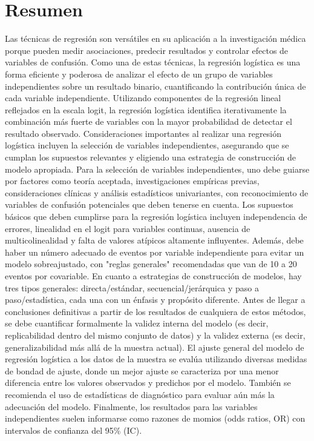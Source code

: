 \documentclass[12pt]{article}
\begin{document}
\section*{Resumen}
Las t\'ecnicas de regresi\'on son vers\'atiles en su aplicaci\'on a la investigaci\'on m\'edica porque pueden medir asociaciones, predecir resultados y controlar efectos de variables de confusi\'on. Como una de estas t\'ecnicas, la regresi\'on log\'istica es una forma eficiente y poderosa de analizar el efecto de un grupo de variables independientes sobre un resultado binario, cuantificando la contribuci\'on \'unica de cada variable independiente. Utilizando componentes de la regresi\'on lineal reflejados en la escala logit, la regresi\'on log\'istica identifica iterativamente la combinaci\'on m\'as fuerte de variables con la mayor probabilidad de detectar el resultado observado. Consideraciones importantes al realizar una regresi\'on log\'istica incluyen la selecci\'on de variables independientes, asegurando que se cumplan los supuestos relevantes y eligiendo una estrategia de construcci\'on de modelo apropiada. Para la selecci\'on de variables independientes, uno debe guiarse por factores como teor\'ia aceptada, investigaciones emp\'iricas previas, consideraciones cl\'inicas y an\'alisis estad\'isticos univariantes, con reconocimiento de variables de confusi\'on potenciales que deben tenerse en cuenta. Los supuestos b\'asicos que deben cumplirse para la regresi\'on log\'istica incluyen independencia de errores, linealidad en el logit para variables continuas, ausencia de multicolinealidad y falta de valores at\'ipicos altamente influyentes. Adem\'as, debe haber un n\'umero adecuado de eventos por variable independiente para evitar un modelo sobreajustado, con "reglas generales" recomendadas que van de 10 a 20 eventos por covariable. En cuanto a estrategias de construcci\'on de modelos, hay tres tipos generales: directa/est\'andar, secuencial/jer\'arquica y paso a paso/estad\'istica, cada una con un \'enfasis y prop\'osito diferente. Antes de llegar a conclusiones definitivas a partir de los resultados de cualquiera de estos m\'etodos, se debe cuantificar formalmente la validez interna del modelo (es decir, replicabilidad dentro del mismo conjunto de datos) y la validez externa (es decir, generalizabilidad m\'as all\'a de la muestra actual). El ajuste general del modelo de regresi\'on log\'istica a los datos de la muestra se eval\'ua utilizando diversas medidas de bondad de ajuste, donde un mejor ajuste se caracteriza por una menor diferencia entre los valores observados y predichos por el modelo. Tambi\'en se recomienda el uso de estad\'isticas de diagn\'ostico para evaluar a\'un m\'as la adecuaci\'on del modelo. Finalmente, los resultados para las variables independientes suelen informarse como razones de momios (odds ratios, OR) con intervalos de confianza del 95\% (IC).
\end{document}
